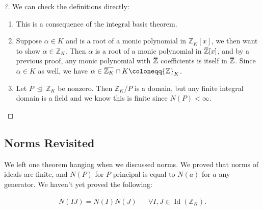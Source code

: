 \begin{proof}[?]

We can check the definitions directly:

\begin{enumerate}
\def\labelenumi{\alph{enumi}.}
\item
  This is a consequence of the integral basis theorem.
\item
  Suppose \(\alpha \in K\) and is a root of a monic polynomial in
  \({\mathbb{Z}}_K[x]\), we then want to show
  \(\alpha\in {\mathbb{Z}}_K\). Then \(\alpha\) is a root of a monic
  polynomial in
  \(\mkern 1.5mu\overline{\mkern-1.5mu{\mathbb{Z}}\mkern-1.5mu}\mkern 1.5mu[x]\),
  and by a previous proof, any monic polynomial with
  \(\mkern 1.5mu\overline{\mkern-1.5mu{\mathbb{Z}}\mkern-1.5mu}\mkern 1.5mu\)
  coefficients is itself in
  \(\mkern 1.5mu\overline{\mkern-1.5mu{\mathbb{Z}}\mkern-1.5mu}\mkern 1.5mu\).
  Since \(\alpha \in K\) as well, we have
  \(\alpha\in \mkern 1.5mu\overline{\mkern-1.5mu{\mathbb{Z}}_K\mkern-1.5mu}\mkern 1.5mu \cap K \coloneqq{\mathbb{Z}}_K\).
\item
  Let \(P {~\trianglelefteq~}{\mathbb{Z}}_K\) be nonzero. Then
  \({\mathbb{Z}}_K/P\) is a domain, but any finite integral domain is a
  field and we know this is finite since \(N(P) < \infty\).
\end{enumerate}

\end{proof}

\hypertarget{norms-revisited}{%
\subsection{Norms Revisited}\label{norms-revisited}}

\begin{remark}

We left one theorem hanging when we discussed norms. We proved that
norms of ideals are finite, and \(N(P)\) for \(P\) principal is equal to
\(N(a)\) for \(a\) any generator. We haven't yet proved the following:

\end{remark}

\begin{theorem}[?]

\begin{align*}
N(IJ) = N(I) N(J) && \forall I, J \in \operatorname{Id}({\mathbb{Z}}_K)
.\end{align*}

\end{theorem}

